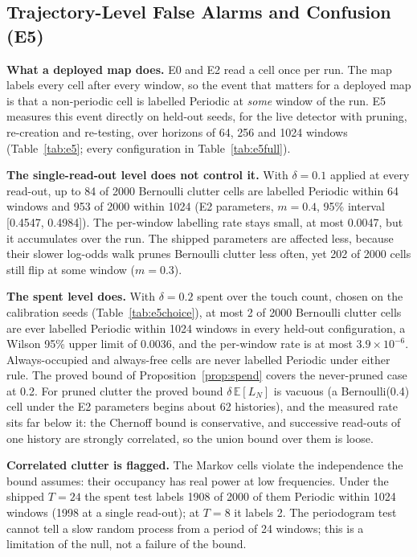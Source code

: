 


\subsection{Trajectory-Level False Alarms and Confusion (E5)}\label{subsec:traj}





\noindent\textbf{What a deployed map does.} E0 and E2 read a cell once per run. The map labels every cell after every window, so the event that matters for a deployed map is that a non-periodic cell is labelled Periodic at \emph{some} window of the run. E5 measures this event directly on held-out seeds, for the live detector with pruning, re-creation and re-testing, over horizons of 64, 256 and 1024 windows (Table~\ref{tab:e5}; every configuration in Table~\ref{tab:e5full}).

\noindent\textbf{The single-read-out level does not control it.} With $\delta{=}0.1$ applied at every read-out, up to 84 of 2000 Bernoulli clutter cells are labelled Periodic within 64 windows and 953 of 2000 within 1024 (E2 parameters, $m{=}0.4$, 95\% interval [0.4547, 0.4984]). The per-window labelling rate stays small, at most 0.0047, but it accumulates over the run. The shipped parameters are affected less, because their slower log-odds walk prunes Bernoulli clutter less often, yet 202 of 2000 cells still flip at some window ($m{=}0.3$).

\noindent\textbf{The spent level does.} With $\delta{=}0.2$ spent over the touch count, chosen on the calibration seeds (Table~\ref{tab:e5choice}), at most 2 of 2000 Bernoulli clutter cells are ever labelled Periodic within 1024 windows in every held-out configuration, a Wilson 95\% upper limit of 0.0036, and the per-window rate is at most $3.9{\times}10^{-6}$. Always-occupied and always-free cells are never labelled Periodic under either rule. The proved bound of Proposition~\ref{prop:spend} covers the never-pruned case at 0.2. For pruned clutter the proved bound $\delta\,\mathbb{E}[L_N]$ is vacuous (a Bernoulli(0.4) cell under the E2 parameters begins about 62 histories), and the measured rate sits far below it: the Chernoff bound is conservative, and successive read-outs of one history are strongly correlated, so the union bound over them is loose.

\noindent\textbf{Correlated clutter is flagged.} The Markov cells violate the independence the bound assumes: their occupancy has real power at low frequencies. Under the shipped $T{=}24$ the spent test labels 1908 of 2000 of them Periodic within 1024 windows (1998 at a single read-out); at $T{=}8$ it labels 2. The periodogram test cannot tell a slow random process from a period of 24 windows; this is a limitation of the null, not a failure of the bound.

